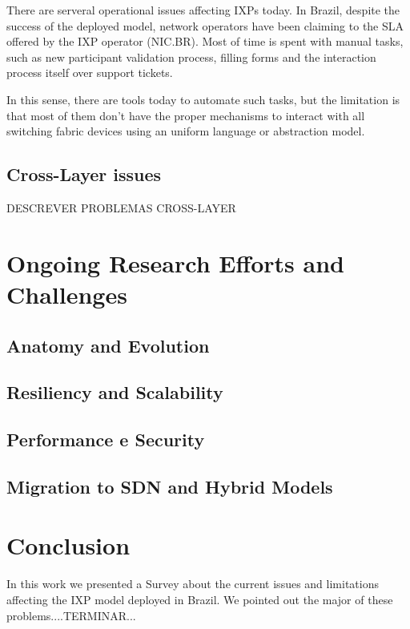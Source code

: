 \documentclass[12pt]{article}
\begin{document}
There are serveral operational issues affecting IXPs today. In Brazil, despite the success of the deployed model, network operators have been claiming to the SLA offered by the IXP operator (NIC.BR). Most of time is spent with manual tasks, such as new participant validation process, filling forms and the interaction process itself over support tickets.


In this sense, there are tools today to automate such tasks, but the limitation is that most of them don't have the proper mechanisms to interact with all switching fabric devices using an uniform language or abstraction model.

\subsection{Cross-Layer issues}
\label{subsec:crosslayer}
DESCREVER PROBLEMAS CROSS-LAYER

\section{Ongoing Research Efforts and Challenges}
\label{sec:ongoingresearch}

\subsection{Anatomy and Evolution}
\subsection{Resiliency and Scalability}
\subsection{Performance e Security}
\subsection{Migration to SDN and Hybrid Models}

\section{Conclusion}
\label{sec:conclusion}
In this work we presented a Survey about the current issues and limitations affecting the IXP model deployed in Brazil. We pointed out the major of these problems....TERMINAR...



\end{document}

